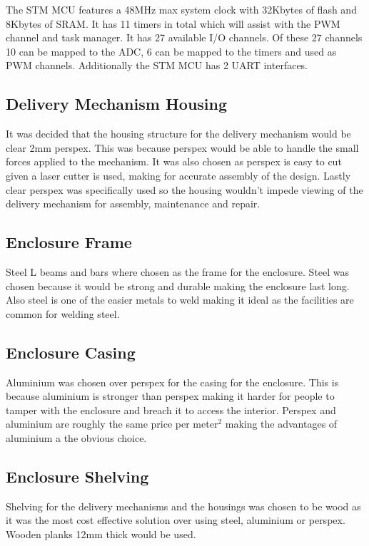 \documentclass[a4paper,11pt]{article}
\numberwithin{figure}{section}
\numberwithin{table}{section}
\begin{document}
The STM MCU features a 48MHz max system clock with 32Kbytes of flash and 8Kbytes of SRAM. It has 11 timers in total which will assist with the PWM channel and task manager. It has 27 available I/O channels. Of these 27 channels 10 can be mapped to the ADC, 6 can be mapped to the timers and used as PWM channels. Additionally the STM MCU has 2 UART interfaces.

\subsection{Delivery Mechanism Housing}
It was decided that the housing structure for the delivery mechanism would be clear 2mm perspex. This was because perspex would be able to handle the small forces applied to the mechanism. It was also chosen as perspex is easy to cut given a laser cutter is used, making for accurate assembly of the design. Lastly clear perspex was specifically used so the housing wouldn't impede viewing of the delivery mechanism for assembly, maintenance and repair. 

\subsection{Enclosure Frame}
Steel L beams and bars where chosen as the frame for the enclosure. Steel was chosen because it would be strong and durable making the enclosure last long. Also steel is one of the easier metals to weld making it ideal as the facilities are common for welding steel.

\subsection{Enclosure Casing}
Aluminium was chosen over perspex for the casing for the enclosure. This is because aluminium is stronger than perspex making it harder for people to tamper with the enclosure and breach it to access the interior. Perspex and aluminium are roughly the same price per meter$^2$ making the advantages of aluminium a the obvious choice.  

\subsection{Enclosure Shelving}
Shelving for the delivery mechanisms and the housings was chosen to be wood as it was the most cost effective solution over using steel, aluminium or perspex. Wooden planks 12mm thick would be used.

\newpage
\end{document}
